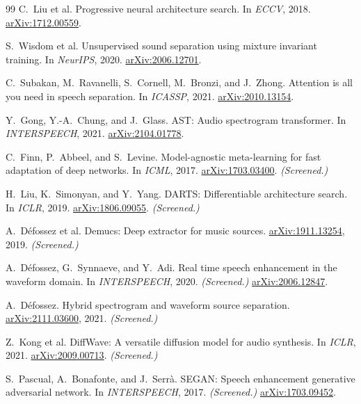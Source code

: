 \documentclass[10pt,twocolumn,letterpaper]{article}
\theoremstyle{remark}
\begin{document}
{\begin{thebibliography}{99}
C.~Liu et al.
\newblock Progressive neural architecture search.
\newblock In \emph{ECCV}, 2018.
\newblock \href{https://arxiv.org/abs/1712.00559}{arXiv:1712.00559}.

S.~Wisdom et al.
\newblock Unsupervised sound separation using mixture invariant training.
\newblock In \emph{NeurIPS}, 2020.
\newblock \href{https://arxiv.org/abs/2006.12701}{arXiv:2006.12701}.

C.~Subakan, M.~Ravanelli, S.~Cornell, M.~Bronzi, and J.~Zhong.
\newblock Attention is all you need in speech separation.
\newblock In \emph{ICASSP}, 2021.
\newblock \href{https://arxiv.org/abs/2010.13154}{arXiv:2010.13154}.

Y.~Gong, Y.-A.~Chung, and J.~Glass.
\newblock AST: Audio spectrogram transformer.
\newblock In \emph{INTERSPEECH}, 2021.
\newblock \href{https://arxiv.org/abs/2104.01778}{arXiv:2104.01778}.

C.~Finn, P.~Abbeel, and S.~Levine.
\newblock Model-agnostic meta-learning for fast adaptation of deep networks.
\newblock In \emph{ICML}, 2017.
\newblock \href{https://arxiv.org/abs/1703.03400}{arXiv:1703.03400}. \textit{(Screened.)}

H.~Liu, K.~Simonyan, and Y.~Yang.
\newblock DARTS: Differentiable architecture search.
\newblock In \emph{ICLR}, 2019.
\newblock \href{https://arxiv.org/abs/1806.09055}{arXiv:1806.09055}. \textit{(Screened.)}

A.~D\'efossez et al.
\newblock Demucs: Deep extractor for music sources.
\newblock \href{https://arxiv.org/abs/1911.13254}{arXiv:1911.13254}, 2019. \textit{(Screened.)}

A.~D\'efossez, G.~Synnaeve, and Y.~Adi.
\newblock Real time speech enhancement in the waveform domain.
\newblock In \emph{INTERSPEECH}, 2020. \textit{(Screened.)}
\newblock \href{https://arxiv.org/abs/2006.12847}{arXiv:2006.12847}.

A.~D\'efossez.
\newblock Hybrid spectrogram and waveform source separation.
\newblock \href{https://arxiv.org/abs/2111.03600}{arXiv:2111.03600}, 2021. \textit{(Screened.)}

Z.~Kong et al.
\newblock DiffWave: A versatile diffusion model for audio synthesis.
\newblock In \emph{ICLR}, 2021.
\newblock \href{https://arxiv.org/abs/2009.00713}{arXiv:2009.00713}. \textit{(Screened.)}

S.~Pascual, A.~Bonafonte, and J.~Serr\`a.
\newblock SEGAN: Speech enhancement generative adversarial network.
\newblock In \emph{INTERSPEECH}, 2017. \textit{(Screened.)}
\newblock \href{https://arxiv.org/abs/1703.09452}{arXiv:1703.09452}.

\end{thebibliography}
}
\end{document}

